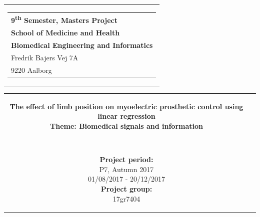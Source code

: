 % 
\thispagestyle{empty}
\begin{titlepage}
{\samepage 

\begin{tabular}{r}
\parbox{\textwidth}{  
\hfill \hspace{2cm} \parbox{8cm}{\begin{tabular}{l} %
{\small \textbf{\textcolor{aaublue}{{9\textsuperscript{th} Semester, Masters Project}}}}\\
{\small \textbf{\textcolor{aaublue}{School of Medicine and Health}}}\\
{\small \textbf{\textcolor{aaublue}{Biomedical Engineering and Informatics}}}\\
{\small \textcolor{aaublue}{Fredrik Bajers Vej 7A}} \\
{\small \textcolor{aaublue}{9220 Aalborg}} \\
\end{tabular}}}
\end{tabular}}

\begin{tabular}{cc}
\parbox{7cm}{

\textbf{The effect of limb position on myoelectric prosthetic control using linear regression}
\\
\textbf{Theme: Biomedical signals and information}

\small{
\\
}


\parbox{8cm}{


\textbf{Project period:}\\
P7, Autumn 2017\\
01/08/2017 - 20/12/2017\\
   
\textbf{Project group:}\\
17gr7404\\ %
  
}}
\end{tabular}
\end{titlepage}
